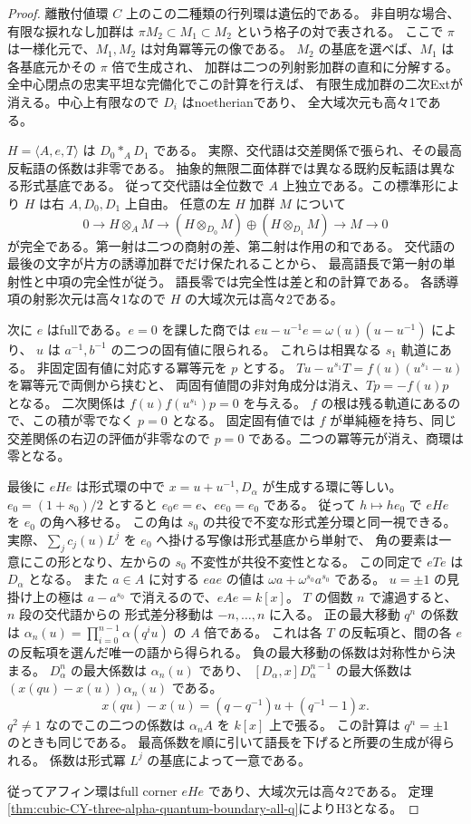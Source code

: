 \begin{proof}
離散付値環 $C$ 上のこの二種類の行列環は遺伝的である。
非自明な場合、有限な捩れなし加群は
$\pi M_2\subset M_1\subset M_2$ という格子の対で表される。
ここで $\pi$ は一様化元で、$M_1,M_2$ は対角冪等元の像である。
$M_2$ の基底を選べば、$M_1$ は各基底元かその $\pi$ 倍で生成され、
加群は二つの列射影加群の直和に分解する。
全中心閉点の忠実平坦な完備化でこの計算を行えば、
有限生成加群の二次Extが消える。中心上有限なので $D_i$ はnoetherianであり、
全大域次元も高々1である。

$H=\langle A,e,T\rangle$ は $D_0*_A D_1$ である。
実際、交代語は交差関係で張られ、その最高反転語の係数は非零である。
抽象的無限二面体群では異なる既約反転語は異なる形式基底である。
従って交代語は全位数で $A$ 上独立である。この標準形により $H$ は右 $A,D_0,D_1$ 上自由。
任意の左 $H$ 加群 $M$ について
\[
 0\longrightarrow H\otimes_A M
 \longrightarrow (H\otimes_{D_0}M)\oplus(H\otimes_{D_1}M)
 \longrightarrow M\longrightarrow0
\]
が完全である。第一射は二つの商射の差、第二射は作用の和である。
交代語の最後の文字が片方の誘導加群でだけ保たれることから、
最高語長で第一射の単射性と中項の完全性が従う。
語長零では完全性は差と和の計算である。
各誘導項の射影次元は高々1なので $H$ の大域次元は高々2である。

次に $e$ はfullである。$e=0$ を課した商では
$e u-u^{-1}e=\omega(u)(u-u^{-1})$ により、
$u$ は $a^{-1},b^{-1}$ の二つの固有値に限られる。
これらは相異なる $s_1$ 軌道にある。
非固定固有値に対応する冪等元を $p$ とする。
$T u-u^{s_1}T=f(u)(u^{s_1}-u)$ を冪等元で両側から挟むと、
両固有値間の非対角成分は消え、$Tp=-f(u)p$ となる。
二次関係は $f(u)f(u^{s_1})p=0$ を与える。
$f$ の根は残る軌道にあるので、この積が零でなく $p=0$ となる。
固定固有値では $f$ が単純極を持ち、同じ交差関係の右辺の評価が非零なので
$p=0$ である。二つの冪等元が消え、商環は零となる。

最後に $eHe$ は形式環の中で $x=u+u^{-1},D_\alpha$ が生成する環に等しい。
$e_0=(1+s_0)/2$ とすると $e_0e=e$、$ee_0=e_0$ である。
従って $h\mapsto he_0$ で $eHe$ を $e_0$ の角へ移せる。
この角は $s_0$ の共役で不変な形式差分環と同一視できる。
実際、$\sum_j c_j(u)L^j$ を $e_0$ へ掛ける写像は形式基底から単射で、
角の要素は一意にこの形となり、左からの $s_0$ 不変性が共役不変性となる。
この同定で $eTe$ は $D_\alpha$ となる。
また $a\in A$ に対する $eae$ の値は $\omega a+\omega^{s_0}a^{s_0}$ である。
$u=\pm1$ の見掛け上の極は $a-a^{s_0}$ で消えるので、$eAe=k[x]$。
$T$ の個数 $n$ で濾過すると、$n$ 段の交代語からの
形式差分移動は $-n,\ldots,n$ に入る。
正の最大移動 $q^n$ の係数は
$\alpha_n(u)=\prod_{i=0}^{n-1}\alpha(q^i u)$ の $A$ 倍である。
これは各 $T$ の反転項と、間の各 $e$ の反転項を選んだ唯一の語から得られる。
負の最大移動の係数は対称性から決まる。
$D_\alpha^n$ の最大係数は $\alpha_n(u)$ であり、
$[D_\alpha,x]D_\alpha^{n-1}$ の最大係数は
$(x(qu)-x(u))\alpha_n(u)$ である。
\[
 x(qu)-x(u)=(q-q^{-1})u+(q^{-1}-1)x .
\]
$q^2\ne1$ なのでこの二つの係数は $\alpha_n A$ を $k[x]$ 上で張る。
この計算は $q^n=\pm1$ のときも同じである。
最高係数を順に引いて語長を下げると所要の生成が得られる。
係数は形式冪 $L^j$ の基底によって一意である。

従ってアフィン環はfull corner $eHe$ であり、大域次元は高々2である。
定理\ref{thm:cubic-CY-three-alpha-quantum-boundary-all-q}によりH3となる。
\end{proof}

